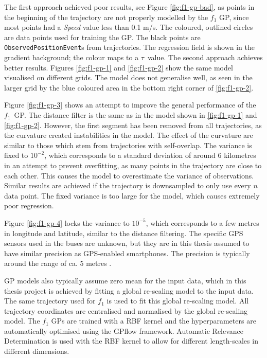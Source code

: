 The first approach achieved poor results, see Figure \ref{fig:f1-gp-bad}, as points in the beginning of the trajectory are not properly modelled by the $f_1$ GP, since most points had a \textit{Speed} value less than 0.1 m/s.
The coloured, outlined circles are data points used for training the GP.
The black points are \texttt{ObservedPositionEvent}s from trajectories.
The regression field is shown in the gradient background; the colour maps to a $\tau$ value.
The second approach achieves better results.
Figures \ref{fig:f1-gp-1} and \ref{fig:f1-gp-2} show the same model visualised on different grids.
The model does not generalise well, as seen in the larger grid by the blue coloured area in the bottom right corner of \ref{fig:f1-gp-2}.

Figure \ref{fig:f1-gp-3} shows an attempt to improve the general performance of the $f_1$ GP.
The distance filter is the same as in the model shown in \ref{fig:f1-gp-1} and \ref{fig:f1-gp-2}.
However, the first segment has been removed from all trajectories, as the curvature created instabilities in the model.
The effect of the curvature are similar to those which stem from trajectories with self-overlap.
The variance is fixed to $10^{-2}$, which corresponds to a standard deviation of around 6 kilometres in an attempt to prevent overfitting, as many points in the trajectory are close to each other.
This causes the model to overestimate the variance of observations.
Similar results are achieved if the trajectory is downsampled to only use every $n$ data point.
The fixed variance is too large for the model, which causes extremely poor regression.

Figure \ref{fig:f1-gp-4} locks the variance to $10^{-5}$, which corresponds to a few metres in longitude and latitude, similar to the distance filtering.
The specific GPS sensors used in the buses are unknown, but they are in this thesis assumed to have similar precision as GPS-enabled smartphones.
The precision is typically around the range of ca. 5 metres \cite{van2015}.

GP models also typically assume zero mean for the input data, which in this thesis project is achieved by fitting a global re-scaling model to the input data.
The same trajectory used for $f_1$ is used to fit this global re-scaling model.
All trajectory coordinates are centralised and normalised by the global re-scaling model. 
The $f_1$ GPs are trained with a RBF kernel and the hyperparameters are automatically optimised using the GPflow framework.
Automatic Relevance Determination \cite{Rasmussen2006} is used with the RBF kernel to allow for different length-scales in different dimensions.

